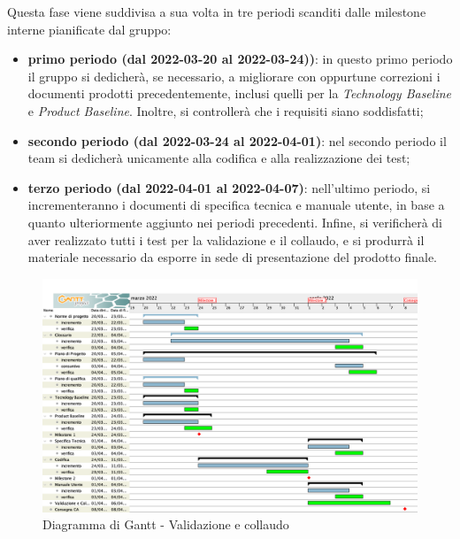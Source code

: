 Questa fase viene suddivisa a sua volta in tre periodi scanditi dalle milestone interne pianificate dal gruppo:
\begin{itemize}
	\item \textbf{primo periodo (dal 2022-03-20 al 2022-03-24))}: in questo primo periodo il gruppo si dedicherà,  se necessario,  a migliorare con oppurtune correzioni i documenti prodotti precedentemente,  inclusi quelli per la \textit{Technology Baseline} e \textit{Product Baseline}.  Inoltre,  si controllerà che i requisiti siano soddisfatti;
	\item \textbf{secondo periodo (dal 2022-03-24 al 2022-04-01)}: nel secondo periodo il team si dedicherà unicamente alla codifica e alla realizzazione dei test;
	\item \textbf{terzo periodo (dal 2022-04-01 al 2022-04-07)}: nell'ultimo periodo,  si incrementeranno i documenti di specifica tecnica e manuale utente,  in base a quanto ulteriormente aggiunto nei periodi precedenti.  Infine,  si verificherà di aver realizzato tutti i test per la validazione e il collaudo,  e si produrrà il materiale necessario da esporre in sede di presentazione del prodotto finale.
\end{itemize}

\begin{figure}[H]
\centering
\includegraphics[scale=0.35]{Sezioni/gantt/validazione_collaudo.png}
\caption{Diagramma di Gantt - Validazione e collaudo}
\end{figure}